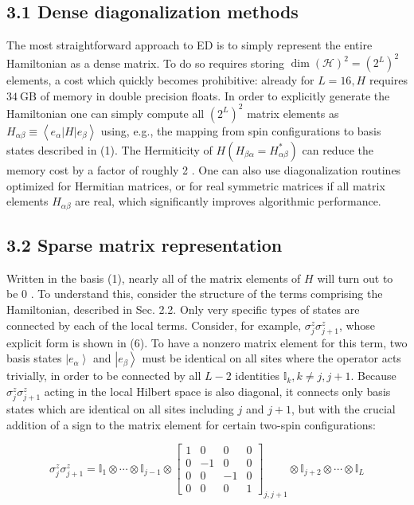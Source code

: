 \documentclass[12pt]{article}
\begin{document}
\subsection*{3.1 Dense diagonalization methods}
The most straightforward approach to ED is to simply represent the entire Hamiltonian as a dense matrix. To do so requires storing $\operatorname{dim}(\mathcal{H})^{2}=\left(2^{L}\right)^{2}$ elements, a cost which quickly becomes prohibitive: already for $L=16, H$ requires $34 \mathrm{~GB}$ of memory in double precision floats. In order to explicitly generate the Hamiltonian one can simply compute all $\left(2^{L}\right)^{2}$ matrix elements as $H_{\alpha \beta} \equiv\left\langle e_{\alpha}|H| e_{\beta}\right\rangle$ using, e.g., the mapping from spin configurations to basis states described in (1). The Hermiticity of $H\left(H_{\beta \alpha}=H_{\alpha \beta}^{*}\right)$ can reduce the memory cost by a factor of roughly 2 . One can also use diagonalization routines optimized for Hermitian matrices, or for real symmetric matrices if all matrix elements $H_{\alpha \beta}$ are real, which significantly improves algorithmic performance.\\

\subsection*{3.2 Sparse matrix representation}
Written in the basis (1), nearly all of the matrix elements of $H$ will turn out to be 0 . To understand this, consider the structure of the terms comprising the Hamiltonian, described in Sec. 2.2. Only very specific types of states are connected by each of the local terms. Consider, for example, $\sigma_{j}^{z} \sigma_{j+1}^{z}$, whose explicit form is shown in (6). To have a nonzero matrix element for this term, two basis states $\left|e_{\alpha}\right\rangle$ and $\left|e_{\beta}\right\rangle$ must be identical on all sites where the operator acts trivially, in order to be connected by all $L-2$ identities $\mathbb{I}_{k}, k \neq j, j+1$. Because $\sigma_{j}^{z} \sigma_{j+1}^{z}$ acting in the local Hilbert space is also diagonal, it connects only basis states which are identical on all sites including $j$ and $j+1$, but with the crucial addition of a sign to the matrix element for certain two-spin configurations:

\[
\sigma_{j}^{z} \sigma_{j+1}^{z}=\mathbb{I}_{1} \otimes \cdots \otimes \mathbb{I}_{j-1} \otimes\left[\begin{array}{cccc}
1 & 0 & 0 & 0  \tag{10}\\
0 & -1 & 0 & 0 \\
0 & 0 & -1 & 0 \\
0 & 0 & 0 & 1
\end{array}\right]_{j, j+1} \otimes \mathbb{I}_{j+2} \otimes \cdots \otimes \mathbb{I}_{L}
\]
\end{document}
